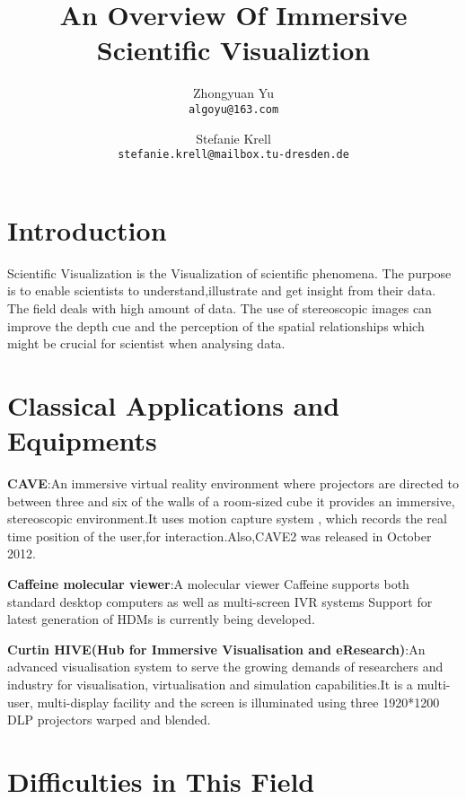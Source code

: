 \documentclass[10pt,twocolumn,letterpaper]{article}
\begin{document}
\title{An Overview Of Immersive Scientific Visualiztion}

\author{Zhongyuan Yu\\
{\tt\small algoyu@163.com}
\and
Stefanie Krell\\
{\tt\small stefanie.krell@mailbox.tu-dresden.de}
}

\maketitle


\section{Introduction}

Scientific Visualization is the Visualization of scientific phenomena. The purpose is to enable scientists to understand,illustrate and get insight from their data. The field deals with high amount of data. The use of stereoscopic images can improve the depth cue and the perception of the spatial relationships which might be crucial for scientist when analysing data.

\section{Classical Applications and Equipments}


\textbf{CAVE}:An immersive virtual reality environment where projectors are directed to between three and six of the walls of a room-sized cube it provides an immersive, stereoscopic environment.It uses motion capture system , which records the real time position of the user,for interaction.Also,CAVE2 was released in October 2012.

\setlength{\parindent}{1pc}
\textbf{Caffeine molecular viewer}:A molecular viewer Caffeine supports both standard desktop computers as well as multi-screen IVR systems Support for latest generation of HDMs is currently being developed.

\setlength{\parindent}{1pc}
\textbf{Curtin HIVE(Hub for Immersive Visualisation and eResearch)}:An advanced visualisation system to serve the growing demands of researchers and industry for visualisation, virtualisation and simulation capabilities.It is a multi-user, multi-display facility and the screen is illuminated using three 1920*1200 DLP projectors warped and blended.

\section{Difficulties in This Field}
\subsection{
}
\end{document}
